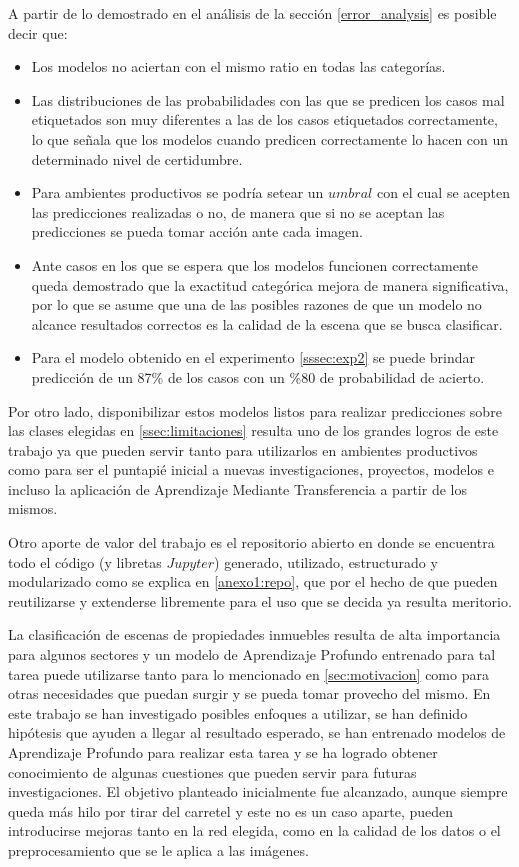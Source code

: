 A partir de lo demostrado en el análisis de la sección \ref{error_analysis} es posible decir que:
\begin{itemize}
	\item Los modelos no aciertan con el mismo ratio en todas las categorías.
	\item Las distribuciones de las probabilidades con las que se predicen los casos mal etiquetados son muy diferentes a las de los casos etiquetados correctamente, lo que señala que los modelos cuando predicen correctamente lo hacen con un determinado nivel de certidumbre.
	\item Para ambientes productivos se podría setear un \(umbral\) con el cual se acepten las predicciones realizadas o no, de manera que si no se aceptan las predicciones se pueda tomar acción ante cada imagen.
	\item Ante casos en los que se espera que los modelos funcionen correctamente 
	queda demostrado que la exactitud categórica mejora de manera significativa, por lo que se asume que una de las posibles razones de que un modelo no alcance resultados correctos es la calidad de la escena que se busca clasificar.
	\item Para el modelo obtenido en el experimento \ref{sssec:exp2} se puede brindar predicción de un 87\% de los casos con un \%80 de probabilidad de acierto.
\end{itemize} 

Por otro lado, disponibilizar estos modelos listos para realizar predicciones sobre las clases elegidas en \ref{ssec:limitaciones} resulta uno de los grandes logros de este trabajo ya que pueden servir tanto para utilizarlos en ambientes productivos como para ser el puntapié inicial a nuevas investigaciones, proyectos, modelos e incluso la aplicación de Aprendizaje Mediante Transferencia a partir de los mismos.

Otro aporte de valor del trabajo es el repositorio abierto en donde se encuentra todo el código (y libretas \(Jupyter\)) generado, utilizado, estructurado y modularizado como se explica en \ref{anexo1:repo}, que por el hecho de que pueden reutilizarse y extenderse libremente para el uso que se decida ya resulta meritorio.

La clasificación de escenas de propiedades inmuebles resulta de alta importancia para algunos sectores y un modelo de Aprendizaje Profundo entrenado para tal tarea puede utilizarse tanto para lo mencionado en \ref{sec:motivacion} como para otras necesidades que puedan surgir y se pueda tomar provecho del mismo. En este trabajo se han investigado posibles enfoques a utilizar, se han definido hipótesis que ayuden a llegar al resultado esperado, se han entrenado modelos de Aprendizaje Profundo para realizar esta tarea y se ha logrado obtener conocimiento de algunas cuestiones que pueden servir para futuras investigaciones. El objetivo planteado inicialmente fue alcanzado, aunque siempre queda más hilo por tirar del carretel y este no es un caso aparte, pueden introducirse mejoras tanto en la red elegida, como en la calidad de los datos o el preprocesamiento que se le aplica a las imágenes.

